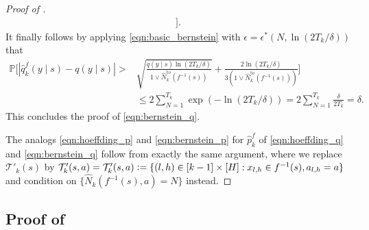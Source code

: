 \documentclass[11pt]{article}
\newcommand{\eqdef}{\vcentcolon=}
\newcommand{\mcT}{\mathcal{T}}
\newcommand{\mbbP}{\mathbb{P}}
\theoremstyle{definition}
\theoremstyle{definition}
\begin{document}
\begin{proof}[Proof of ]
\begin{equation}
\begin{split}
			\bigr]
			.
		\end{split}
	\end{equation}
	It finally follows by applying \eqref{eqn:basic_bernstein} with $\epsilon=\epsilon^*(N,\ln(2T_k/\delta))$ that
	\begin{equation}
		\begin{split}
			\mbbP\biggl[
			| \hat{q}^f_k(y\mid s)-q(y\mid s) |
			>
			 &
			\sqrt{\frac{q(y\mid s) \ln(2T_k/\delta)}{1\vee\hat{N}^{\mathrm{to}}_k(f^{-1}(s))}}
			+
			\frac{2\ln(2T_k/\delta)}{3(1\vee\hat{N}^{\mathrm{to}}_k(f^{-1}(s)))}
			\biggr]
			\\
			 &
			\leq
			2\sum_{N=1}^{T_k}
			\exp(
			-
			\ln(2T_k/\delta)
			)
			=
			2\sum_{N=1}^{T_k}\frac{\delta}{2T_k}
			=
			\delta.
		\end{split}
	\end{equation}
	This concludes the proof of \eqref{eqn:bernstein_q}.

	The analogs \eqref{eqn:hoeffding_p} and \eqref{eqn:bernstein_p} for $\hat{p}_k^f$ of \eqref{eqn:hoeffding_q} and \eqref{eqn:bernstein_q} follow from exactly the same argument, where we replace $\mcT'_k(s)$ by $\mcT'_k(s,a)=\mcT'_k(s,a)\eqdef \{(l,h)\in[k-1]\times [H]:x_{l,h}\in f^{-1}(s),a_{l,h}=a\}$ and condition on $\{\hat{N}_k(f^{-1}(s),a)=N\}$ instead.
\end{proof}

\subsection{Proof of \texorpdfstring{}{decomposition for optimism}}
\label{sec:proof_of_optimism_simulation}
\end{document}
